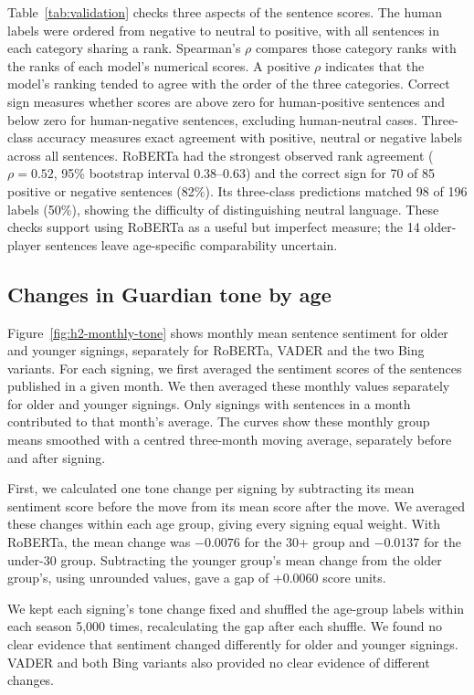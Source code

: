 Table~\ref{tab:validation} checks three aspects of the sentence scores. The human labels were ordered from negative to neutral to positive, with all sentences in each category sharing a rank. Spearman's $\rho$ compares those category ranks with the ranks of each model's numerical scores. A positive $\rho$ indicates that the model's ranking tended to agree with the order of the three categories. Correct sign measures whether scores are above zero for human-positive sentences and below zero for human-negative sentences, excluding human-neutral cases. Three-class accuracy measures exact agreement with positive, neutral or negative labels across all sentences. RoBERTa had the strongest observed rank agreement ($\rho = 0.52$, 95\% bootstrap interval 0.38--0.63) and the correct sign for 70 of 85 positive or negative sentences (82\%). Its three-class predictions matched 98 of 196 labels (50\%), showing the difficulty of distinguishing neutral language. These checks support using RoBERTa as a useful but imperfect measure; the 14 older-player sentences leave age-specific comparability uncertain.



\guardianSentimentFigure
\subsection*{Changes in Guardian tone by age}

Figure~\ref{fig:h2-monthly-tone} shows monthly mean sentence sentiment for older and younger signings, separately for RoBERTa, VADER and the two Bing variants. For each signing, we first averaged the sentiment scores of the sentences published in a given month. We then averaged these monthly values separately for older and younger signings. Only signings with sentences in a month contributed to that month's average. The curves show these monthly group means smoothed with a centred three-month moving average, separately before and after signing.

First, we calculated one tone change per signing by subtracting its mean sentiment score before the move from its mean score after the move. We averaged these changes within each age group, giving every signing equal weight. With RoBERTa, the mean change was $-0.0076$ for the 30+ group and $-0.0137$ for the under-30 group. Subtracting the younger group's mean change from the older group's, using unrounded values, gave a gap of +0.0060 score units.

We kept each signing's tone change fixed and shuffled the age-group labels within each season 5,000 times, recalculating the gap after each shuffle. We found no clear evidence that sentiment changed differently for older and younger signings. VADER and both Bing variants also provided no clear evidence of different changes.

